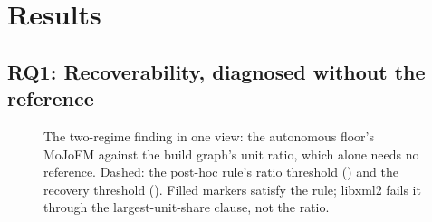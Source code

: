 \section{Results}
\label{sec:results}


\subsection{RQ1: Recoverability, diagnosed without the reference}
\label{sec:rq1}




\begin{figure}[t]
  \centering
  \resizebox{0.9\columnwidth}{!}{}
  \caption{The two-regime finding in one view: the autonomous floor's MoJoFM against the build
  graph's unit ratio, which alone needs no reference. Dashed: the post-hoc rule's ratio
  threshold (\rqAdequacyRatioMax{}) and the recovery threshold (\rqTwoRecoveredMin{}). Filled
  markers satisfy the rule; libxml2 fails it through the largest-unit-share clause, not the
  ratio.}
  \label{fig:regimes}
\end{figure}

